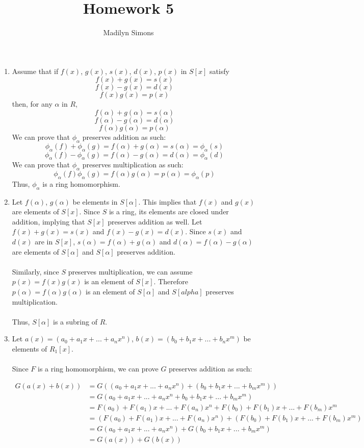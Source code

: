 \documentclass{article}
\title{Homework 5}
\author{Madilyn Simons}
\date{}
\begin{document}
\maketitle

\begin{enumerate}

\item Assume that if $f(x)$, $g(x)$, $s(x)$, $d(x)$, $p(x)$ in $S[x]$ satisfy
\[
f(x) + g(x) = s(x)
\] \[
f(x) - g(x) = d(x)
\] \[
f(x)g(x) = p(x)
\]
then, for any $\alpha$ in $R$,
\[
\] \[
f(\alpha) + g(\alpha) = s(\alpha)
\] \[
f(\alpha) - g(\alpha) = d(\alpha)
\] \[
f(\alpha)g(\alpha) = p(\alpha)
\]
We can prove that $\phi_{\alpha}$ preserves addition as such:
\[
\phi_{\alpha}(f) + \phi_{\alpha}(g) = f(\alpha) + g(\alpha) = s(\alpha) = \phi_{\alpha}(s)
\] \[
\phi_{\alpha}(f) - \phi_{\alpha}(g) = f(\alpha) - g(\alpha) = d(\alpha) = \phi_{\alpha}(d)
\]
We can prove that $\phi_{\alpha}$ preserves multiplication as such:
\[
\phi_{\alpha}(f)\phi_{\alpha}(g) = f(\alpha)g(\alpha) = p(\alpha) = \phi_{\alpha}(p)
\]
Thus, $\phi_{\alpha}$ is a ring homomorphism.

\item Let $f(\alpha)$, $g(\alpha)$ be elements in $S[\alpha]$.  This implies
that $f(x)$ and $g(x)$ are elements of $S[x]$.  Since $S$ is a ring, its
elements are closed under addition, implying that $S[x]$ preserves
addition as well.  Let $f(x) + g(x) = s(x)$ and $f(x) - g(x) = d(x)$.  Since
$s(x)$ and $d(x)$ are in $S[x]$, $s(\alpha) = f(\alpha) + g(\alpha)$ and
$d(\alpha) = f(\alpha) - g(\alpha)$ are elements of $S[\alpha]$ and $S[\alpha]$
preserves addition.
\\
\\
Similarly, since $S$ preserves multiplication, we can assume $p(x) = f(x)g(x)$
is an element of $S[x]$.  Therefore $p(\alpha) = f(\alpha)g(\alpha)$ is an
element of $S[\alpha]$ and $S[alpha]$ preserves multiplication.
\\
\\
Thus, $S[\alpha]$ is a subring of $R$.




\item Let $a(x) = (a_0 + a_{1}x + ... + a_{n}x^n)$, $b(x) = (b_0 + b_{1}x + ... + b_{n}x^m)$
be elements of $R_{1}[x]$.
\\ \\
Since $F$ is a ring homomorphism, we can prove $G$ preserves addition as such:

\begin{align*}
G(a(x) + b(x)) &= G((a_0 + a_{1}x + ... + a_{n}x^{n}) + (b_0 + b_{1}x + ... + b_{m}x^{m})) \\
&= G(a_0 + a_{1}x + ... + a_{n}x^n + b_0 + b_{1}x + ... + b_{m}x^{m}) \\
&= F(a_{0}) + F(a_{1})x + ... + F(a_{n})x^{n} + F(b_{0}) + F(b_{1})x + ... + F(b_{m})x^{m} \\
&= (F(a_{0}) + F(a_{1})x + ... + F(a_{n})x^{n}) + (F(b_{0}) + F(b_{1})x + ... + F(b_{m})x^{m}) \\
&= G(a_0 + a_{1}x + ... + a_{n}x^{n}) + G(b_0 + b_{1}x + ... + b_{m}x^{m}) \\
&= G(a(x)) + G(b(x))
\end{align*}


\end{enumerate}
\end{document}
